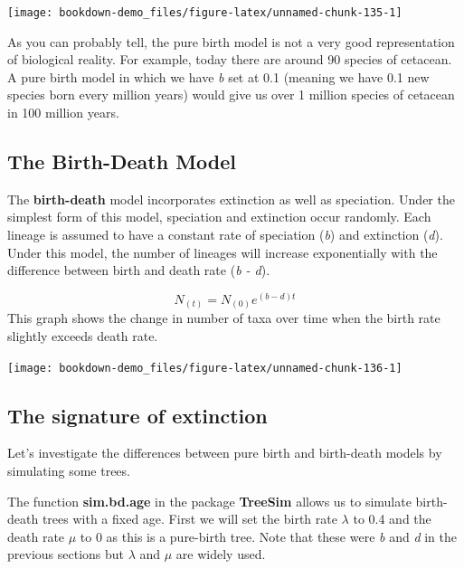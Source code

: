 \documentclass[
]{book}
\begin{document}
\begin{center}\texttt{[image: bookdown-demo\_files/figure-latex/unnamed-chunk-135-1]} \end{center}

As you can probably tell, the pure birth model is not a very good representation of biological reality. For example, today there are around 90 species of cetacean. A pure birth model in which we have \emph{b} set at 0.1 (meaning we have 0.1 new species born every million years) would give us over 1 million species of cetacean in 100 million years.

\hypertarget{the-birth-death-model}{%
\subsection{The Birth-Death Model}\label{the-birth-death-model}}

The \textbf{birth-death} model incorporates extinction as well as speciation. Under the simplest form of this model, speciation and extinction occur randomly. Each lineage is assumed to have a constant rate of speciation (\emph{b}) and extinction (\emph{d}). Under this model, the number of lineages will increase exponentially with the difference between birth and death rate (\emph{b - d}).

\[ N_{(t)} = N_{(0)}e^{(b-d)t} \]
This graph shows the change in number of taxa over time when the birth rate slightly exceeds death rate.

\begin{center}\texttt{[image: bookdown-demo\_files/figure-latex/unnamed-chunk-136-1]} \end{center}

\hypertarget{the-signature-of-extinction}{%
\subsection{The signature of extinction}\label{the-signature-of-extinction}}

Let's investigate the differences between pure birth and birth-death models by simulating some trees.

The function \textbf{sim.bd.age} in the package \textbf{TreeSim} \citep{treesim} allows us to simulate birth-death trees with a fixed age. First we will set the birth rate \(\lambda\) to 0.4 and the death rate \(\mu\) to 0 as this is a pure-birth tree. Note that these were \emph{b} and \emph{d} in the previous sections but \(\lambda\) and \(\mu\) are widely used.
\end{document}
